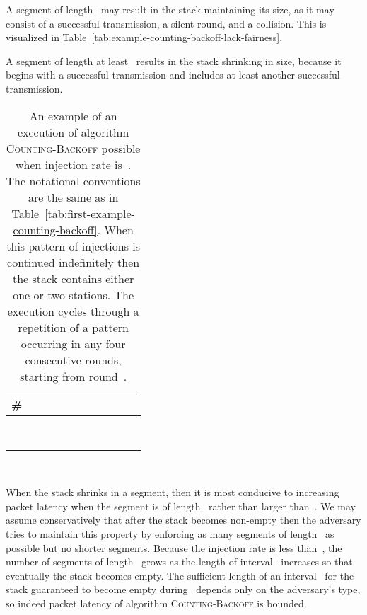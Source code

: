 \documentclass[11pt]{article}
\newlength{\pagewidth}
\newcommand{\RB}{\raisebox{2.5ex}{~}}
\newcommand{\LB}{\raisebox{-1.5ex}{~}}
\begin{document}
A segment of length~ may result in the stack maintaining its size, as it may consist of a successful transmission, a silent round, and a collision.
This is visualized in Table~\ref{tab:example-counting-backoff-lack-fairness}.

A segment of length at least~ results in the stack shrinking in size, because it begins with a successful transmission and  includes at least another successful transmission.





\begin{table}[t]
\begin{center}
\begin{tabular}{| c ||c |c |c |c |c | c | c | c | c | c | }
\hline
\RB \LB
\# &  &  &  &&&  & & &  &  \\
\hline\hline
\RB \LB
&   &  &  & & && & &  &\\
\hline
\RB \LB
 & &  &  && & & &&&\\
\hline
\RB \LB
 & & &   & & & &&& &\\
\hline
\RB \LB
 & & &&   & &&&& &\\
\hline
\RB \LB
 & & && &  &&&& &\\
\hline
\RB \LB
 & & &&  & &   &&& &\\
\hline
\RB \LB
 & & &&  & &&&& &\\
\hline
\RB \LB
 & & &&  & &&&  & &\\
\hline
\end{tabular}
\parbox{\pagewidth}{
~
\caption{\label{tab:example-counting-backoff-stack-does-not-grow}
An example of an execution of algorithm \textsc{Counting-Backoff} possible when injection rate is~.
The notational conventions are the same as in Table~\ref{tab:first-example-counting-backoff}.
When this pattern of injections is continued indefinitely then the stack contains either one or two stations.
The execution cycles through a repetition of a pattern occurring in any four consecutive rounds, starting from round~.
}}
\end{center}
\end{table}


When the stack shrinks in a segment, then it is most conducive to increasing packet latency when the segment is of length~ rather than larger than~.
We may assume conservatively that after the stack becomes non-empty then the adversary tries to maintain this property by enforcing as many segments of length~ as possible but no shorter segments.
Because the injection rate is less than~, the number of segments of length~ grows as the length of interval~ increases so that eventually the stack becomes empty.
The sufficient length of an interval~ for the stack guaranteed to become empty during~  depends only on the adversary's type, so indeed packet latency of algorithm \textsc{Counting-Backoff} is bounded.
\end{document}
